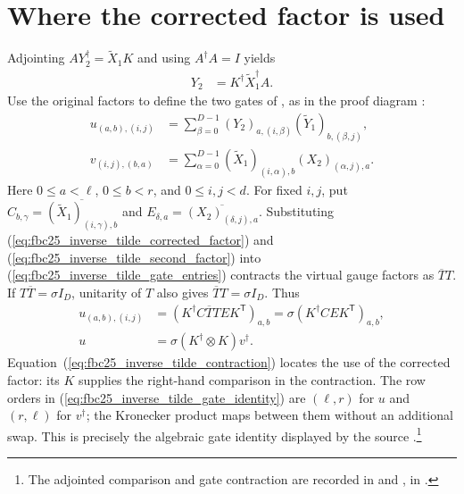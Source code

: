 \documentclass{article}
\begin{document}
\section{Where the corrected factor is used}

Adjointing $AY_2^\dagger=\widetilde X_1K$ and using $A^\dagger A=I$ yields
\begin{align}
    Y_2 & =K^\dagger\widetilde X_1^\dagger A.
    \label{eq:fbc25_inverse_tilde_second_factor}
\end{align}
Use the original factors to define the two gates of
, as in the proof diagram
\cite[lines~5444--5487]{FrancoRubio2025MPUGauging}:
\begin{align}
    u_{(a,b),(i,j)} & =\sum_{\beta=0}^{D-1}(Y_2)_{a,(i,\beta)}
    (\widetilde Y_1)_{b,(\beta,j)},
    \label{eq:fbc25_inverse_tilde_gate_entries}                             \\
    v_{(i,j),(b,a)} & =\sum_{\alpha=0}^{D-1}(\widetilde X_1)_{(i,\alpha),b}
    (X_2)_{(\alpha,j),a}.
\end{align}
Here $0\leq a<\ell$, $0\leq b<r$, and $0\leq i,j<d$.
For fixed $i,j$, put
$C_{b,\gamma}=\overline{(\widetilde X_1)_{(i,\gamma),b}}$ and
$E_{\delta,a}=\overline{(X_2)_{(\delta,j),a}}$.
Substituting
(\ref{eq:fbc25_inverse_tilde_corrected_factor}) and
(\ref{eq:fbc25_inverse_tilde_second_factor}) into
(\ref{eq:fbc25_inverse_tilde_gate_entries}) contracts the virtual gauge factors as $\overline T T$.
If $T\overline T=\sigma I_D$, unitarity of $T$ also gives $\overline T T=\sigma I_D$. Thus
\begin{align}
    u_{(a,b),(i,j)}
      & =(K^\dagger C\overline T T E K^{\mathsf T})_{a,b}
    =\sigma(K^\dagger C E K^{\mathsf T})_{a,b},
    \label{eq:fbc25_inverse_tilde_contraction}            \\
    u & =\sigma(K^\dagger\otimes K)v^\dagger.
    \label{eq:fbc25_inverse_tilde_gate_identity}
\end{align}
Equation~(\ref{eq:fbc25_inverse_tilde_contraction}) locates the use of the corrected factor: its $K$ supplies the right-hand comparison in the contraction. The row orders in
(\ref{eq:fbc25_inverse_tilde_gate_identity}) are $(\ell,r)$ for $u$ and $(r,\ell)$ for $v^\dagger$; the Kronecker product maps between them without an additional swap. This is precisely the algebraic gate identity displayed by the source
\cite[lines~5484--5486]{FrancoRubio2025MPUGauging}.\footnote{The adjointed comparison and gate contraction are recorded in
     and
    , in
    .}
\end{document}
